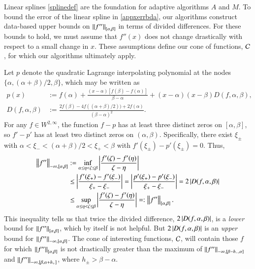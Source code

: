 \documentclass[review]{elsarticle}
\theoremstyle{definition}
\renewcommand{\cw}{W}
\begin{document}
Linear splines \eqref{splinedef} are the foundation for adaptive algorithms $A$
and $M$. To bound the error of the linear spline in \eqref{appxerrbda}, our
algorithms construct data-based upper bounds on $\norm[{[\alpha, \beta]}]{f''}$
in terms of divided differences. For these bounds to hold, we must assume that
$f''(x)$ does not change drastically with respect to a small change in $x$.
These assumptions define our cone of functions, $\cc$, for which our algorithms
ultimately apply.

Let $p$ denote the quadratic Lagrange interpolating polynomial at the nodes
$\{\alpha, (\alpha + \beta)/2, \beta\}$, which may be written as
\begin{align}
\nonumber
   p(x) & := f(\alpha) + \frac{(x-\alpha)[f(\beta) - f(\alpha)]}{\beta - \alpha}  +
   (x-\alpha)(x-\beta) D(f,\alpha,\beta),
\\ D(f,\alpha,\beta) &:= \frac{2f(\beta) - 4f((\alpha + \beta)/2))
	+ 2f(\alpha)}{(\beta - \alpha)^2}. \label{divdiffdef}
\end{align}
For any $f \in \cw^{2,\infty}$, the function $f - p$ has at least three distinct
zeros on $[\alpha,\beta]$, so $f' - p'$ has at least two distinct zeros on
$(\alpha,\beta)$.  Specifically, there exist $\xi_\pm$ with $\alpha < \xi_- < (\alpha +
\beta)/2 < \xi_+ < \beta$ with $f'(\xi_\pm) - p'(\xi_{\pm}) = 0$. Thus,
\begin{align}
     \norm[-\infty,{[\alpha,\beta]}]{f''}
   & := \inf_{\alpha \le \eta < \zeta \le \beta} \abs{\frac{f'(\zeta) - f'(\eta)}{\zeta - \eta}}
   \nonumber
\\ & \le \abs{\frac{f'(\xi_+) - f'(\xi_-)}{\xi_+ - \xi_-}}
   = \abs{\frac{p'(\xi_+) - p'(\xi_-)}{\xi_+ - \xi_-}} = 2 \abs{D(f,\alpha,\beta)}  \nonumber
\\ & \le \sup_{\alpha \le \eta < \zeta \le \beta} \abs{\frac{f'(\zeta) - f'(\eta)}{\zeta - \eta}}
=: \norm[{[\alpha,\beta]}]{f''}. \label{NDDbdm}
\end{align}
This inequality tells us that twice the divided difference,
$2\abs{D(f,\alpha,\beta)}$, is a \emph{lower} bound for
$\norm[{[\alpha,\beta]}]{f''}$, which by itself is not helpful. But
$2\abs{D(f,\alpha,\beta)}$ is an \emph{upper} bound for
$\norm[-\infty,{[\alpha,\beta]}]{f''}$. The cone of interesting functions,
$\cc$, will contain those $f$ for which $\norm[{[\alpha,\beta]}]{f''}$ is not
drastically greater than the maximum of $\norm[-\infty,{[\beta - h_-,
\alpha]}]{f''}$ and $\norm[-\infty,{[\beta, \alpha+ h_+]}]{f''}$, where $h_{\pm} > \beta -
\alpha$.
\end{document}
